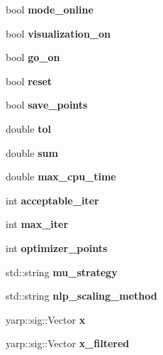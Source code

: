 \begin{DoxyCompactItemize}
\item 
bool {\bfseries mode\-\_\-online}\label{classSuperqModule_adfab63f5b7aad436d9833898ea23602a}

\item 
bool {\bfseries visualization\-\_\-on}\label{classSuperqModule_aecdc7d85514cc472b7a91982d6b1f58d}

\item 
bool {\bfseries go\-\_\-on}\label{classSuperqModule_a46bddbc5530c3086005ad07281bc5ae9}

\item 
bool {\bfseries reset}\label{classSuperqModule_ad3f77b480fd86b554fabf882c090ddc1}

\item 
bool {\bfseries save\-\_\-points}\label{classSuperqModule_a67a8bc8f0d0464efc29caf5465f256e6}

\item 
double {\bfseries tol}\label{classSuperqModule_ad4843804d3d340b725debf434e5347b5}

\item 
double {\bfseries sum}\label{classSuperqModule_a01f96b54badeaf38908355577586a4c0}

\item 
double {\bfseries max\-\_\-cpu\-\_\-time}\label{classSuperqModule_aace6a0e5aa42c5e376a5e60397a4dcea}

\item 
int {\bfseries acceptable\-\_\-iter}\label{classSuperqModule_ab3c64f8ffe227d91ab3fcc8983589b3a}

\item 
int {\bfseries max\-\_\-iter}\label{classSuperqModule_ae130c3d3d0ac884336761ded94731f1b}

\item 
int {\bfseries optimizer\-\_\-points}\label{classSuperqModule_ae796a494cc0be47bf8888e9f876784dc}

\item 
std\-::string {\bfseries mu\-\_\-strategy}\label{classSuperqModule_a29a3eb467fb15cb219b43c70a8cfda8a}

\item 
std\-::string {\bfseries nlp\-\_\-scaling\-\_\-method}\label{classSuperqModule_a01f9c7e0ec759b78c782483aaf2f0085}

\item 
yarp\-::sig\-::\-Vector {\bfseries x}\label{classSuperqModule_a8b845bdc0c6d35d90141968502ca9d96}

\item 
yarp\-::sig\-::\-Vector {\bfseries x\-\_\-filtered}\label{classSuperqModule_adb96b7bb58edc83b70dcd4781b51130a}


\end{DoxyCompactItemize}
